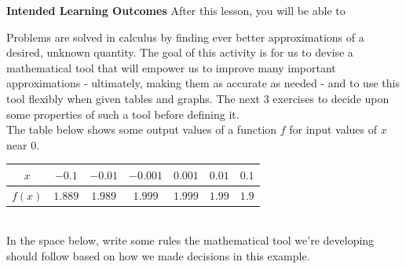 \documentclass[10pt]{article}
\begin{document}
\pagestyle{otherpages}
\thispagestyle{firstpage}
\textbf{Intended Learning Outcomes}
After this lesson, you will be able to 


\vspace{-0.3cm}

\hrulefill

\vspace{0.3cm}

Problems are solved in calculus by finding ever better approximations of a desired, unknown quantity. The goal of this activity is for us to devise a mathematical tool that will empower us to improve many important approximations - ultimately, making them as accurate as needed - and to use this tool flexibly when given tables and graphs. The next $3$ exercises to decide upon some properties of such a tool before defining it.\\


 The table below shows some output values of a function $f$ for input values of $x$ near $0$. 
%
\begin{center}
\begin{tabular}{| c || c c c c c c |}
\hline
 $x$  & $-0.1$ & $-0.01$ & $-0.001$ &  $0.001$ & $0.01$ & $0.1$\\ 
 \hline
 $f(x)$ & $1.889$ & $1.989$  & $1.999$ & $1.999$   & $1.99$  & $1.9$\\
 \hline
\end{tabular}
\end{center}

~\\In the space below, write some rules the mathematical tool we're developing should follow based on how we made decisions in this example.
\end{document}
